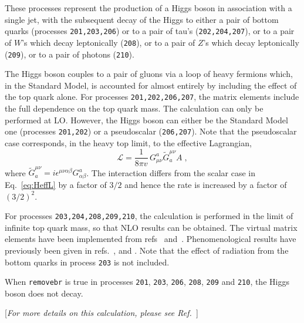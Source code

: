 \label{subsec:hjet}

These processes represent the production of a Higgs boson in association
with a single jet, with the subsequent decay of the Higgs to either
a pair of bottom quarks (processes {\tt 201,203,206}) 
or to a pair of tau's ({\tt 202,204,207}),
or to a pair of $W$'s which decay leptonically ({\tt 208}),
or to a pair of $Z$'s which decay leptonically ({\tt 209}),
or to a pair of photons ({\tt 210}).

The Higgs boson couples to a pair of gluons via a loop of heavy fermions
which, in the Standard Model, is accounted for almost entirely by including
the effect of the top quark alone. For processes {\tt 201,202,206,207}, the
matrix elements include the full dependence on the top quark mass.
The calculation can only be performed at LO. 
However, the Higgs boson can either be the Standard Model one
(processes {\tt 201,202}) or a pseudoscalar ({\tt 206,207}).
Note that the pseudoscalar case corresponds, in the heavy top limit, to the effective Lagrangian,
\begin{equation}
\mathcal{L} = \frac{1}{8\pi v} \, G^a_{\mu\nu} \widetilde G^{\mu\nu}_a A \;,
\end{equation}
where $\widetilde G^{\mu\nu}_a = i\epsilon^{\mu\nu\alpha\beta}
 G_{\alpha\beta}^a$.
The interaction differs from the scalar case in Eq.~{\ref{eq:HeffL}} by a factor of $3/2$
and hence the rate is increased by a factor of $(3/2)^2$.


For processes {\tt 203,204,208,209,210}, the calculation is performed in the
limit of infinite top quark mass, so that NLO results can be obtained.
The virtual matrix elements have been implemented from
refs~\cite{Ravindran:2002dc} and~\cite{Schmidt:1997wr}.
Phenomenological results have previously been 
given in refs.~\cite{deFlorian:1999zd},\cite{Ravindran:2002dc} 
and \cite{Glosser:2002gm}.
Note that the effect of radiation from the bottom quarks in process {\tt 203}
is not included.

When {\tt removebr} is true in processes {\tt 201}, {\tt 203}, {\tt 206}, {\tt 208}, {\tt 209}
and {\tt 210}, the Higgs boson does not decay.

\label{subsec:wbf}

\begin{center}
[{\it For more details on this calculation, please see Ref.~\cite{Berger:2004pca}}]
\end{center}


